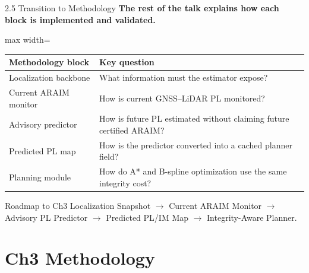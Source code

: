 \documentclass[10pt,aspectratio=169,xcolor=dvipsnames]{beamer}
\newcommand{\smalltable}[1]{\begin{adjustbox}{max width=\linewidth}\scriptsize#1\end{adjustbox}}
\begin{document}
\begin{frame}[t]{2.5 Transition to Methodology}
  \small
  \textbf{The rest of the talk explains how each block is implemented and validated.}
  \vspace{2mm}
  
  \smalltable{%
    \begin{tabular}{p{}p{0.62\textwidth}}
      \toprule
      \textbf{Methodology block} & \textbf{Key question}\\
      \midrule
      Localization backbone & What information must the estimator expose?\\
      Current ARAIM monitor & How is current GNSS--LiDAR PL monitored?\\
      Advisory predictor & How is future PL estimated without claiming future certified ARAIM?\\
      Predicted PL map & How is the predictor converted into a cached planner field?\\
      Planning module & How do A* and B-spline optimization use the same integrity cost?\\
      \bottomrule
  \end{tabular}}
  \vspace{2mm}
  \begin{exampleblock}{Roadmap to Ch3}
    Localization Snapshot $\rightarrow$ Current ARAIM Monitor $\rightarrow$ Advisory PL Predictor $\rightarrow$ Predicted PL/IM Map $\rightarrow$ Integrity-Aware Planner.
  \end{exampleblock}
\end{frame}

\section{Ch3 Methodology}
\end{document}
